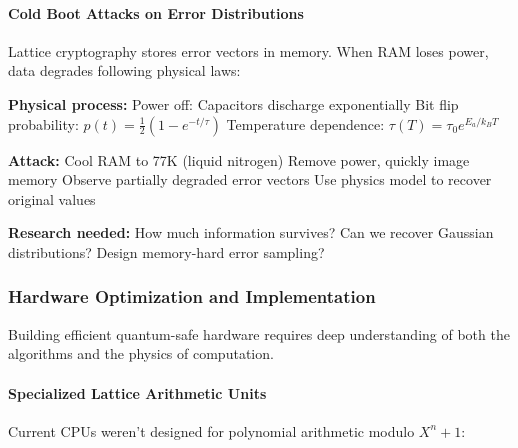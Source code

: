 \documentclass[11pt,a4paper]{article}
\begin{document}
\paragraph{Cold Boot Attacks on Error Distributions}

Lattice cryptography stores error vectors in memory. When RAM loses power, data degrades following physical laws:

\begin{algorithm}
\caption{Cold Boot Attack on LWE Secrets}
\label{alg:cold-boot}
\begin{algorithmic}[1]
\State \textbf{Physical process:}
\State \quad Power off: Capacitors discharge exponentially
\State \quad Bit flip probability: $p(t) = \frac{1}{2}(1 - e^{-t/\tau})$
\State \quad Temperature dependence: $\tau(T) = \tau_0 e^{E_a/k_B T}$

\State \textbf{Attack:}
\State \quad Cool RAM to 77K (liquid nitrogen)
\State \quad Remove power, quickly image memory
\State \quad Observe partially degraded error vectors
\State \quad Use physics model to recover original values

\State \textbf{Research needed:}
\State \quad How much information survives?
\State \quad Can we recover Gaussian distributions?
\State \quad Design memory-hard error sampling?
\end{algorithmic}
\end{algorithm}

\subsubsection{Hardware Optimization and Implementation}

Building efficient quantum-safe hardware requires deep understanding of both the algorithms and the physics of computation.

\paragraph{Specialized Lattice Arithmetic Units}

Current CPUs weren't designed for polynomial arithmetic modulo $X^n + 1$:
\end{document}
